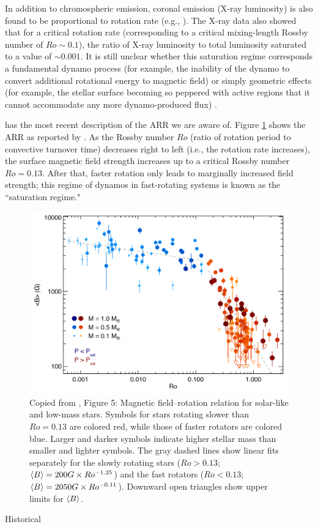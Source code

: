 \documentclass[12pt]{article} %
\begin{document}
In addition to chromospheric emission, coronal emission (X-ray luminosity) is also found to be proportional to rotation rate (e.g., \citealt{Walter1982}). The X-ray data also showed that for a critical rotation rate (corresponding to a critical mixing-length Rossby number of $Ro\sim0.1$), the ratio of X-ray luminosity to total luminosity saturated to a value of $\sim0.001$. It is still unclear whether this saturation regime corresponds a fundamental dynamo process (for example, the inability of the dynamo to convert additional rotational energy to magnetic field) or simply geometric effects (for example, the stellar surface becoming so peppered with active regions that it cannot accommodate any more dynamo-produced flux) \citep{Jardine1999}. 

 \citet{Reiners2022} has the most recent description of the ARR we are aware of. Figure \ref{fig:arr} shows the ARR as reported by \citet{Reiners2022}. As the Rossby number $Ro$ (ratio of rotation period to convective turnover time) decreases right to left (i.e., the rotation rate increases), the surface magnetic field strength increases up to a critical Rossby number $Ro=0.13$. After that, faster rotation only leads to marginally increased field strength; this regime of dynamos in fast-rotating systems is known as the ``saturation regime."

\begin{figure}\label{fig:arr}
	\centering
	\includegraphics[width=6.5in]{ARR.png}
	\caption{Copied from \citet{Reiners2022}, Figure 5: Magnetic field–rotation relation for solar-like and low-mass stars. Symbols for stars rotating slower than $Ro=0.13$ are colored red, while those of faster rotators are colored blue. Larger and darker symbols indicate higher stellar mass than smaller and lighter symbols.  The gray dashed lines show linear fits separately for the slowly rotating stars ($Ro>0.13$;  $\left\langle B\right\rangle=200G\times Ro^{-1.25}$) and the fast rotators ($Ro<0.13$; $\left\langle B\right\rangle=2050 G \times Ro^{-0.11}$). Downward open triangles show upper limits for $\left\langle B\right\rangle$.}
\end{figure}

Historical 

	

\end{document}
